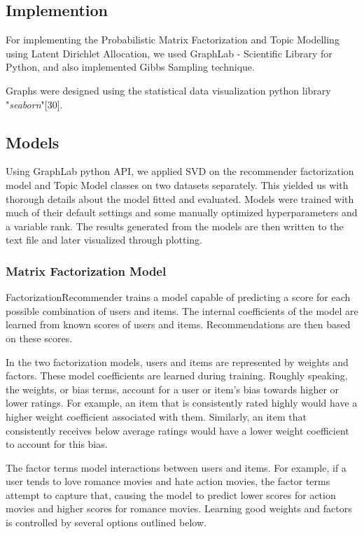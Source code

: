\subsection{Implemention}
For implementing the Probabilistic Matrix Factorization and Topic Modelling using Latent Dirichlet Allocation, we used GraphLab - Scientific Library for Python, and also implemented Gibbs Sampling technique.

Graphs were designed using the statistical data visualization python library "\textit{seaborn}"[30].

\subsection{Models}
Using GraphLab python API, we applied SVD on the recommender factorization model and Topic Model classes on two datasets separately. This yielded us with thorough details about the model fitted and evaluated. Models were trained with much of their default settings and some manually optimized hyperparameters and a variable rank. The results generated from the models are then written to the text file and later visualized through plotting.

\subsubsection{Matrix Factorization Model}
FactorizationRecommender trains a model capable of predicting a score for each possible combination of users and items. The internal coefficients of the model are learned from known scores of users and items. Recommendations are then based on these scores.

In the two factorization models, users and items are represented by weights and factors. These model coefficients are learned during training. Roughly speaking, the weights, or bias terms, account for a user or item’s bias towards higher or lower ratings. For example, an item that is consistently rated highly would have a higher weight coefficient associated with them. Similarly, an item that consistently receives below average ratings would have a lower weight coefficient to account for this bias.

The factor terms model interactions between users and items. For example, if a user tends to love romance movies and hate action movies, the factor terms attempt to capture that, causing the model to predict lower scores for action movies and higher scores for romance movies. Learning good weights and factors is controlled by several options outlined below.

